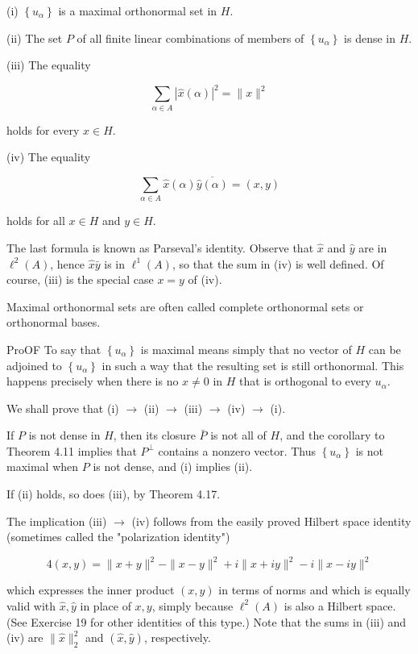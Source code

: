 \documentclass[10pt]{article}
\begin{document}
(i) $\left\{u_{\alpha}\right\}$ is a maximal orthonormal set in $H$.

(ii) The set $P$ of all finite linear combinations of members of $\left\{u_{\alpha}\right\}$ is dense in $H$.

(iii) The equality

$$
\sum_{\alpha \in A}|\hat{x}(\alpha)|^{2}=\|x\|^{2}
$$

holds for every $x \in H$.

(iv) The equality

$$
\sum_{\alpha \in A} \hat{x}(\alpha) \overline{\hat{y}(\alpha)}=(x, y)
$$

holds for all $x \in H$ and $y \in H$.

The last formula is known as Parseval's identity. Observe that $\hat{x}$ and $\hat{y}$ are in $\ell^{2}(A)$, hence $\hat{x} \bar{y}$ is in $\ell^{1}(A)$, so that the sum in (iv) is well defined. Of course, (iii) is the special case $x=y$ of (iv).

Maximal orthonormal sets are often called complete orthonormal sets or orthonormal bases.

ProOF To say that $\left\{u_{\alpha}\right\}$ is maximal means simply that no vector of $H$ can be adjoined to $\left\{u_{\alpha}\right\}$ in such a way that the resulting set is still orthonormal. This happens precisely when there is no $x \neq 0$ in $H$ that is orthogonal to every $u_{\alpha}$.

We shall prove that (i) $\rightarrow$ (ii) $\rightarrow$ (iii) $\rightarrow$ (iv) $\rightarrow$ (i).

If $P$ is not dense in $H$, then its closure $\bar{P}$ is not all of $H$, and the corollary to Theorem 4.11 implies that $P^{\perp}$ contains a nonzero vector. Thus $\left\{u_{\alpha}\right\}$ is not maximal when $P$ is not dense, and (i) implies (ii).

If (ii) holds, so does (iii), by Theorem 4.17.

The implication (iii) $\rightarrow$ (iv) follows from the easily proved Hilbert space identity (sometimes called the "polarization identity")

$$
4(x, y)=\|x+y\|^{2}-\|x-y\|^{2}+i\|x+i y\|^{2}-i\|x-i y\|^{2}
$$

which expresses the inner product $(x, y)$ in terms of norms and which is equally valid with $\hat{x}, \hat{y}$ in place of $x, y$, simply because $\ell^{2}(A)$ is also a Hilbert space. (See Exercise 19 for other identities of this type.) Note that the sums in (iii) and (iv) are $\|\hat{x}\|_{2}^{2}$ and $(\hat{x}, \hat{y})$, respectively.
\end{document}
